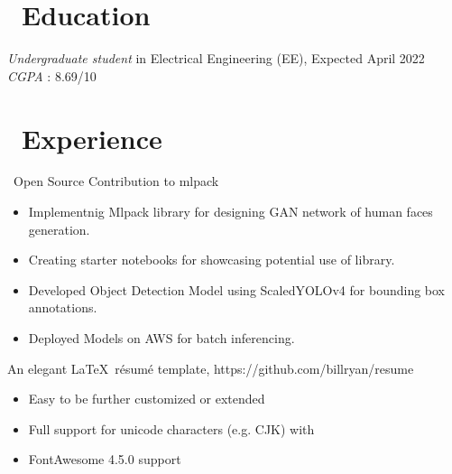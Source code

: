 \documentclass{resume}
\begin{document}



\section{\faGraduationCap\ Education}
\textit{Undergraduate student} in Electrical Engineering (EE), Expected April 2022 \\
\textit {CGPA} : 8.69/10

\section{\faUsers\ Experience}
\role{Student Developer} 
\ Open Source Contribution to mlpack
\begin{itemize}
  \item Implementnig Mlpack library for designing GAN network of human faces generation. 
  \item Creating starter notebooks for showcasing potential use of library. 
\end{itemize}

\begin{itemize}
  \item Developed Object Detection Model using ScaledYOLOv4 for bounding box annotations.
  \item Deployed Models on AWS for batch inferencing.
\end{itemize}

An elegant \LaTeX\ résumé template, https://github.com/billryan/resume
\begin{itemize}
  \item Easy to be further customized or extended
  \item Full support for unicode characters (e.g. CJK) with \XeLaTeX\
  \item FontAwesome 4.5.0 support
\end{itemize}
\end{document}
